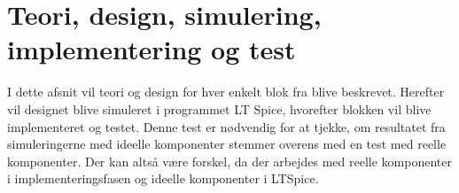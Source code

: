 \section{Teori, design, simulering, implementering og test }
I dette afsnit vil teori og design for hver enkelt blok fra  blive beskrevet. Herefter vil designet blive simuleret i programmet LT Spice, hvorefter blokken vil blive implementeret og testet. Denne test er nødvendig for at tjekke, om resultatet fra simuleringerne med ideelle komponenter stemmer overens med en test med reelle komponenter. Der kan altså være forskel, da der arbejdes med reelle komponenter i implementeringsfasen og ideelle komponenter i LTSpice.
